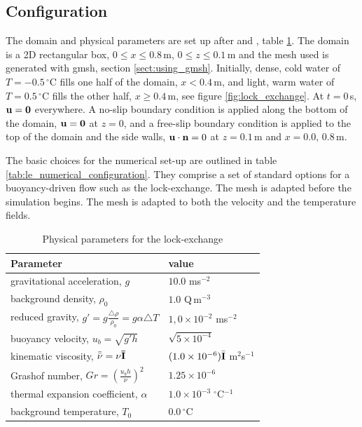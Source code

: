 \subsection{Configuration}
\label{sect:lock_exchange_configuration}

The domain and physical parameters are set up after \cite{fringer_06} and \cite{ozgokmen_07}, table \ref{tab:le_physical_parameters}. The domain is a 2D rectangular box, $0\leq x \leq 0.8\,$m, $0 \leq z \leq 0.1\,$m and the mesh used is generated with gmsh, section \ref{sect:using_gmsh}. Initially, dense, cold water of $T = -0.5\,^\circ$C fills one half of the domain, $x<0.4\,$m, and light, warm water of $T = 0.5\,^\circ$C fills the other half, $x\geq0.4\,$m, see figure \ref{fig:lock_exchange}. At $t=0\,$s, ${\bf u} = {\bf 0}$ everywhere. A no-slip boundary condition is applied along the bottom of the domain, ${\bf u = 0}$ at $z=0$, and a free-slip boundary condition is applied to the top of the domain and the side walls, ${\bf u\cdot\bf n} = 0$ at $z = 0.1\,$m and $x = 0.0,\, 0.8\,$m.

The basic choices for the numerical set-up are outlined in table \ref{tab:le_numerical_configuration}. They comprise a set of standard options for a buoyancy-driven flow such as the lock-exchange. The mesh is adapted before the simulation begins. The mesh is adapted to both the velocity and the temperature fields.  

\begin{table}[th]
\centering
\begin{tabular}[h]{ll}  \hline
Parameter                                                                     & value \\ \hline
gravitational acceleration, $g$                                               & $10.0$ ms$^{-2}$ \\
background density, $\rho_0$                                                  & $1.0$ Q$\,$m$^{-3}$ \\
reduced gravity, $g' = g\frac{\triangle \rho}{\rho_0} = g\alpha \triangle T $ & $1,0 \times 10^{-2}$ ms$^{-2}$ \\
buoyancy velocity, $u_b = \sqrt{g'h}$                                         & $\sqrt{5 \times 10^{-4}}$ \\
kinematic viscosity, $\bar{\bar{\bf \nu}} = \nu\bar{\bf I}$                   & $(1.0 \times 10^{-6})\bar{\bf I}$ m$^2$s$^{-1}$ \\
Grashof number, $Gr = \left( \frac{u_bh}{\nu} \right)^2$                      & $1.25 \times 10^{-6}$\\
thermal expansion coefficient, $\alpha$                                       & $1.0 \times 10^{-3} \;^\circ$C$^{-1}$ \\
background temperature, $T_0$                                                 & $0.0\,^{\circ}$C \\ \hline
\end{tabular}
\caption{Physical parameters for the lock-exchange}
\label{tab:le_physical_parameters}
\end{table}

